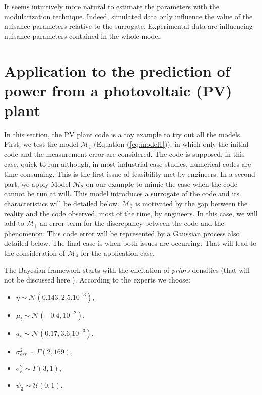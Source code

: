 \documentclass[soumission]{jsfds}
\edef\hc{\string: }
\begin{document}
It seems intuitively more natural to estimate the parameters with the modularization technique. Indeed, simulated data only influence the
value of the nuisance parameters relative to the surrogate. Experimental data are influencing nuisance parameters contained in the whole model.

\section{Application to the prediction of power from a photovoltaic (PV) plant \label{sec:application}}

In this section, the PV plant code is a toy example to try out all the models. First, we test the model $\mathcal{M}_1$ (Equation (\ref{eq:model1})), in which only the initial code and the measurement error are considered. The code is supposed, in this case, quick to run although, in most industrial case studies, numerical codes are time consuming. This is the first issue of feasibility met by engineers. In a second part, we apply Model $\mathcal{M}_2$ on our example to mimic the case when the code cannot be run at will. This model introduces a surrogate of the code and its characteristics will be detailed below. $\mathcal{M}_3$ is motivated by the gap between the reality and the code observed, most of the time, by engineers. In this case, we will add to $\mathcal{M}_1$ an error term for the discrepancy between the code and the phenomenon. This code error will be represented by a Gaussian process also detailed below. The final case is when both issues are occurring. That will lead to the consideration of $\mathcal{M}_4$ for the application case.\newline

The Bayesian framework starts with the elicitation of \textit{priors} densities (that will not be discussed here \citep{Albert2012}). According to the experts we choose\hc
\begin{itemize}
\item $\eta\sim \mathcal{N}(0.143,2.5.10^{-3})$,
\item $\mu_t\sim\mathcal{N}(-0.4,10^{-2})$,
\item $a_r\sim \mathcal{N}(0.17,3.6.10^{-3})$,
\item $\sigma_{err}^2 \sim \Gamma(2,169)$,
\item $\sigma_{\boldsymbol{\delta}}^2\sim \Gamma(3,1)$,
\item $\psi_{\boldsymbol{\delta}} \sim \mathcal{U}(0,1)$. \newline
\end{itemize}
\end{document}
